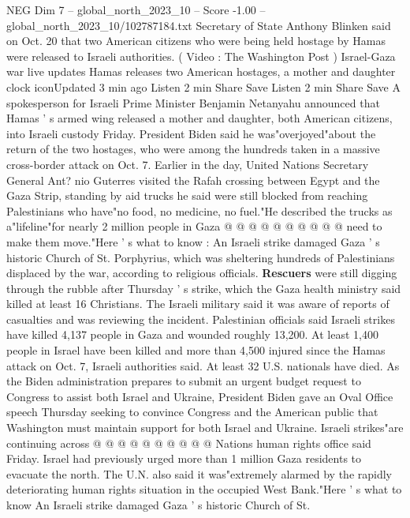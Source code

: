 \begin{textsample}{NEG Dim 7 – global\_north\_2023\_10 – Score -1.00 – global\_north\_2023\_10/102787184.txt}  \label{ex:f7_neg_208}
Secretary of State Anthony Blinken said on Oct. 20 that two American citizens who were being held hostage by Hamas were released to Israeli authorities. ( Video : The Washington Post ) Israel-Gaza war live updates Hamas releases two American hostages, a mother and daughter clock iconUpdated 3 min ago Listen 2 min Share Save Listen 2 min Share Save A spokesperson for Israeli Prime Minister Benjamin Netanyahu announced that Hamas ' s armed wing released a mother and daughter, both American citizens, into Israeli custody Friday.
President Biden said he was"overjoyed"about the return of the two hostages, who were among the hundreds taken in a massive cross-border attack on Oct. 7.
Earlier in the day, United Nations Secretary General Ant? nio Guterres visited the Rafah crossing between Egypt and the Gaza Strip, standing by aid trucks he said were still blocked from reaching Palestinians who have"no food, no medicine, no fuel."He described the trucks as a"lifeline"for nearly 2 million people in Gaza @ @ @ @ @ @ @ @ @ @ need to make them move."Here ' s what to know : An Israeli strike damaged Gaza ' s historic Church of St.
Porphyrius, which was sheltering hundreds of Palestinians displaced by the war, according to religious officials. \textbf{Rescuers} were still digging through the rubble after Thursday ' s strike, which the Gaza health ministry said killed at least 16 Christians.
The Israeli military said it was aware of reports of casualties and was reviewing the incident.
Palestinian officials said Israeli strikes have killed 4,137 people in Gaza and wounded roughly 13,200.
At least 1,400 people in Israel have been killed and more than 4,500 injured since the Hamas attack on Oct. 7, Israeli authorities said.
At least 32 U.S. nationals have died.
As the Biden administration prepares to submit an urgent budget request to Congress to assist both Israel and Ukraine, President Biden gave an Oval Office speech Thursday seeking to convince Congress and the American public that Washington must maintain support for both Israel and Ukraine.
Israeli strikes"are continuing across @ @ @ @ @ @ @ @ @ @ Nations human rights office said Friday.
Israel had previously urged more than 1 million Gaza residents to evacuate the north.
The U.N. also said it was"extremely alarmed by the rapidly deteriorating human rights situation in the occupied West Bank."Here ' s what to know An Israeli strike damaged Gaza ' s historic Church of St.

\end{textsample}
